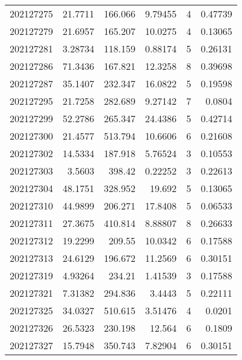 \begin{tabular}{rrrrrr}
 202127275 &         21.7711  &      166.066  &            9.79455 &           4 & 0.47739 \\
 202127279 &         21.6957  &      165.207  &           10.0275  &           4 & 0.13065 \\
 202127281 &          3.28734 &      118.159  &            0.88174 &           5 & 0.26131 \\
 202127286 &         71.3436  &      167.821  &           12.3258  &           8 & 0.39698 \\
 202127287 &         35.1407  &      232.347  &           16.0822  &           5 & 0.19598 \\
 202127295 &         21.7258  &      282.689  &            9.27142 &           7 & 0.0804  \\
 202127299 &         52.2786  &      265.347  &           24.4386  &           5 & 0.42714 \\
 202127300 &         21.4577  &      513.794  &           10.6606  &           6 & 0.21608 \\
 202127302 &         14.5334  &      187.918  &            5.76524 &           3 & 0.10553 \\
 202127303 &          3.5603  &      398.42   &            0.22252 &           3 & 0.22613 \\
 202127304 &         48.1751  &      328.952  &           19.692   &           5 & 0.13065 \\
 202127310 &         44.9899  &      206.271  &           17.8408  &           5 & 0.06533 \\
 202127311 &         27.3675  &      410.814  &            8.88807 &           8 & 0.26633 \\
 202127312 &         19.2299  &      209.55   &           10.0342  &           6 & 0.17588 \\
 202127313 &         24.6129  &      196.672  &           11.2569  &           6 & 0.30151 \\
 202127319 &          4.93264 &      234.21   &            1.41539 &           3 & 0.17588 \\
 202127321 &          7.31382 &      294.836  &            3.4443  &           5 & 0.22111 \\
 202127325 &         34.0327  &      510.615  &            3.51476 &           4 & 0.0201  \\
 202127326 &         26.5323  &      230.198  &           12.564   &           6 & 0.1809  \\
 202127327 &         15.7948  &      350.743  &            7.82904 &           6 & 0.30151 \\

\end{tabular}
